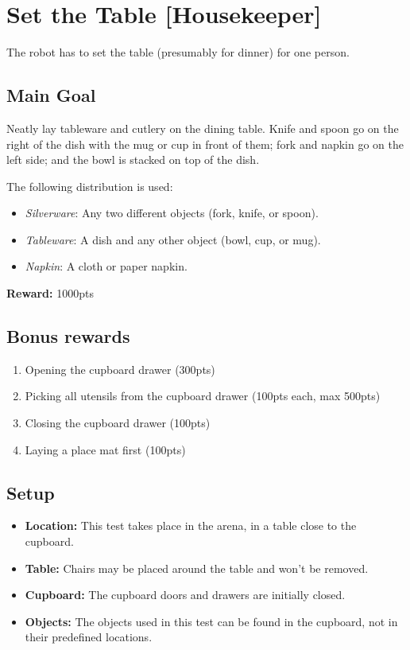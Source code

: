 \section{Set the Table [Housekeeper]}
The robot has to set the table (presumably for dinner) for one person.


\subsection{Main Goal}
Neatly lay tableware and cutlery on the dining table. Knife and spoon go on the right of the dish with the mug or cup in front of them; fork and napkin go on the left side; and the bowl is stacked on top of the dish.

The following distribution is used:
\begin{itemize}[nosep]
	\item\textit{Silverware}: Any two different objects (fork, knife, or spoon).
	\item\textit{Tableware}: A dish and any other object (bowl, cup, or mug).
	\item\textit{Napkin}: A cloth or paper napkin.
\end{itemize}

\noindent\textbf{Reward:} 1000pts



\subsection{Bonus rewards}
\begin{enumerate}[nosep]
	\item Opening the cupboard drawer (300pts)
	\item Picking all utensils from the cupboard drawer (100pts each, max 500pts)
	\item Closing the cupboard drawer (100pts)
	\item Laying a place mat first (100pts)
\end{enumerate}

\subsection{Setup}
\begin{itemize}[nosep]
	\item \textbf{Location:} This test takes place in the arena, in a table close to the cupboard.
	\item \textbf{Table:} Chairs may be placed around the table and won't be removed.
	\item \textbf{Cupboard:} The cupboard doors and drawers are initially closed.
	\item \textbf{Objects:} The objects used in this test can be found in the cupboard, not in their predefined locations.
\end{itemize}


